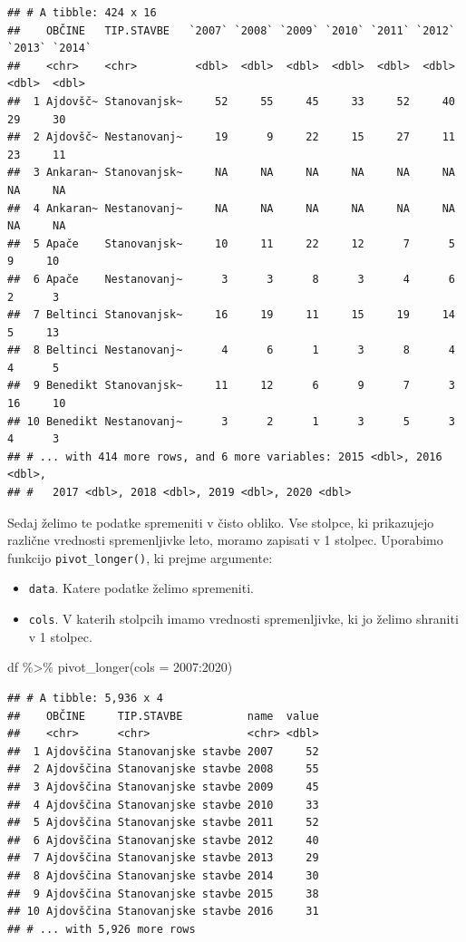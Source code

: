 \documentclass[
]{book}
\newenvironment{Shaded}{\begin{snugshade}}{\end{snugshade}}
\newcommand{\AttributeTok}[1]{\textcolor[rgb]{0.77,0.63,0.00}{#1}}
\newcommand{\FunctionTok}[1]{\textcolor[rgb]{0.00,0.00,0.00}{#1}}
\newcommand{\NormalTok}[1]{#1}
\newcommand{\SpecialCharTok}[1]{\textcolor[rgb]{0.00,0.00,0.00}{#1}}
\newcommand{\StringTok}[1]{\textcolor[rgb]{0.31,0.60,0.02}{#1}}
\providecommand{\tightlist}{%
  \setlength{\itemsep}{0pt}\setlength{\parskip}{0pt}}
\begin{document}
\begin{verbatim}
## # A tibble: 424 x 16
##    OBČINE   TIP.STAVBE   `2007` `2008` `2009` `2010` `2011` `2012` `2013` `2014`
##    <chr>    <chr>         <dbl>  <dbl>  <dbl>  <dbl>  <dbl>  <dbl>  <dbl>  <dbl>
##  1 Ajdovšč~ Stanovanjsk~     52     55     45     33     52     40     29     30
##  2 Ajdovšč~ Nestanovanj~     19      9     22     15     27     11     23     11
##  3 Ankaran~ Stanovanjsk~     NA     NA     NA     NA     NA     NA     NA     NA
##  4 Ankaran~ Nestanovanj~     NA     NA     NA     NA     NA     NA     NA     NA
##  5 Apače    Stanovanjsk~     10     11     22     12      7      5      9     10
##  6 Apače    Nestanovanj~      3      3      8      3      4      6      2      3
##  7 Beltinci Stanovanjsk~     16     19     11     15     19     14      5     13
##  8 Beltinci Nestanovanj~      4      6      1      3      8      4      4      5
##  9 Benedikt Stanovanjsk~     11     12      6      9      7      3     16     10
## 10 Benedikt Nestanovanj~      3      2      1      3      5      3      4      3
## # ... with 414 more rows, and 6 more variables: 2015 <dbl>, 2016 <dbl>,
## #   2017 <dbl>, 2018 <dbl>, 2019 <dbl>, 2020 <dbl>
\end{verbatim}

Sedaj želimo te podatke spremeniti v čisto obliko. Vse stolpce, ki prikazujejo različne vrednosti spremenljivke leto, moramo zapisati v 1 stolpec. Uporabimo funkcijo \texttt{pivot\_longer()}, ki prejme argumente:

\begin{itemize}
\tightlist
\item
  \texttt{data}. Katere podatke želimo spremeniti.
\item
  \texttt{cols}. V katerih stolpcih imamo vrednosti spremenljivke, ki jo želimo shraniti v 1 stolpec.
\end{itemize}

\begin{Shaded}
\begin{Highlighting}[]
\NormalTok{df }\SpecialCharTok{\%\textgreater{}\%} \FunctionTok{pivot\_longer}\NormalTok{(}\AttributeTok{cols =} \StringTok{\textasciigrave{}}\AttributeTok{2007}\StringTok{\textasciigrave{}}\SpecialCharTok{:}\StringTok{\textasciigrave{}}\AttributeTok{2020}\StringTok{\textasciigrave{}}\NormalTok{)}
\end{Highlighting}
\end{Shaded}

\begin{verbatim}
## # A tibble: 5,936 x 4
##    OBČINE     TIP.STAVBE          name  value
##    <chr>      <chr>               <chr> <dbl>
##  1 Ajdovščina Stanovanjske stavbe 2007     52
##  2 Ajdovščina Stanovanjske stavbe 2008     55
##  3 Ajdovščina Stanovanjske stavbe 2009     45
##  4 Ajdovščina Stanovanjske stavbe 2010     33
##  5 Ajdovščina Stanovanjske stavbe 2011     52
##  6 Ajdovščina Stanovanjske stavbe 2012     40
##  7 Ajdovščina Stanovanjske stavbe 2013     29
##  8 Ajdovščina Stanovanjske stavbe 2014     30
##  9 Ajdovščina Stanovanjske stavbe 2015     38
## 10 Ajdovščina Stanovanjske stavbe 2016     31
## # ... with 5,926 more rows
\end{verbatim}
\end{document}
